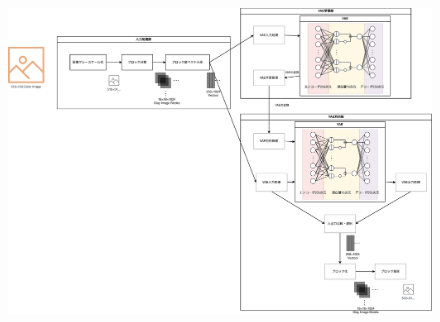 \documentclass[twocolumn, a4j]{jsarticle}
\begin{document}
\begin{figure}
  \includegraphics[scale=0.5]{figure/test.eps}
\end{figure}
\end{document}

